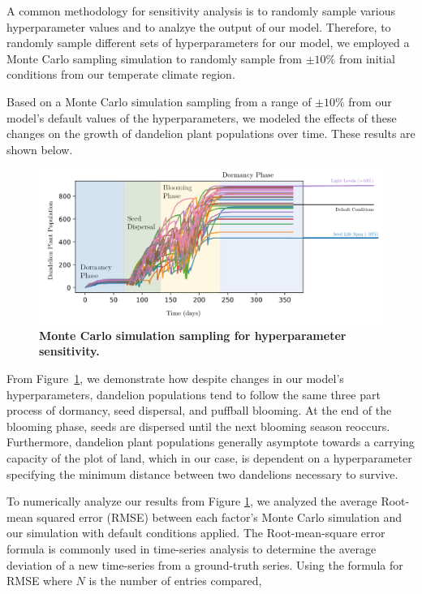 A common methodology for sensitivity analysis is to randomly sample various hyperparameter values and to analzye the output of our model. Therefore, to randomly sample different sets of hyperparameters for our model, we employed a Monte Carlo sampling simulation to randomly sample from \(\pm 10\%\) from initial conditions from our temperate climate region. 

Based on a Monte Carlo simulation sampling from a range of \(\pm 10\%\) from our model's default values of the hyperparameters, we modeled the effects of these changes on the growth of dandelion plant populations over time. These results are shown below.

\begin{figure}[h!]
\centering
    \includegraphics[scale=0.65]{figures/sensitivitypopulation.pdf}
    \captionsetup{width=0.9\textwidth}
    \caption{\textbf{Monte Carlo simulation sampling for hyperparameter sensitivity.}}
    \label{fig:sensitivitypopulation}
\end{figure}

From Figure~\ref{fig:sensitivitypopulation}, we demonstrate how despite changes in our model's hyperparameters, dandelion populations tend to follow the same three part process of dormancy, seed dispersal, and puffball blooming. At the end of the blooming phase, seeds are dispersed until the next blooming season reoccurs. Furthermore, dandelion plant populations generally asymptote towards a carrying capacity of the plot of land, which in our case, is dependent on a hyperparameter specifying the minimum distance between two dandelions necessary to survive.

To numerically analyze our results from Figure \ref{fig:sensitivitypopulation}, we analyzed the average Root-mean squared error (RMSE) between each factor's Monte Carlo simulation and our simulation with default conditions applied. The Root-mean-square error formula is commonly used in time-series analysis to determine the average deviation of a new time-series from a ground-truth series. Using the formula for RMSE where \(N\) is the number of entries compared,

